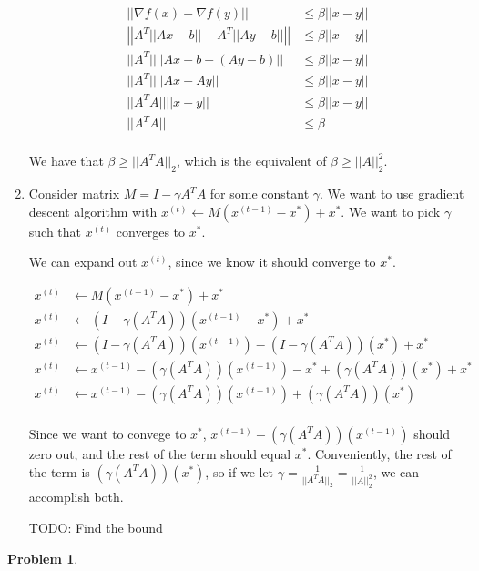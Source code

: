 \documentclass[11pt]{article}
\theoremstyle{definition}
\theoremstyle{case}
\theoremstyle{theorem}
\newtheorem{prob}{Problem}
\begin{document}
\begin{enumerate}[label=(\alph*)]
\begin{align*}
|| \nabla f(x) - \nabla f(y) || &\leq \beta ||x - y|| \\
\left|\left| A^T || Ax - b ||  - A^T || Ay - b || \right|\right| &\leq \beta ||x - y|| \\
|| A^T || || Ax -b - (Ay - b) || &\leq \beta ||x - y|| \\
|| A^T || || Ax - Ay || &\leq \beta ||x - y|| \\
|| A^T A || || x - y || &\leq \beta ||x - y|| \\
|| A^T A || &\leq \beta \\
\end{align*}

We have that $\beta \geq ||A^T A||_2$, which is the equivalent of $\beta \geq ||A||_2^2$.

\item Consider matrix $M = I - \gamma A^T A$ for some constant $\gamma$. We want to use gradient descent
algorithm with $x^{(t)} \longleftarrow M(x^{(t-1)} - x^*) + x^*$. We want to pick $\gamma$ such that $x^{(t)}$ 
converges to $x^*$.

We can expand out $x^{(t)}$, since we know it should converge to $x^*$.

\begin{align*}
x^{(t)} &\longleftarrow M(x^{(t-1)} - x^*) + x^* \\
x^{(t)} &\longleftarrow (I - \gamma(A^T A))(x^{(t-1)} - x^*) + x^* \\
x^{(t)} &\longleftarrow (I - \gamma(A^T A))(x^{(t-1)}) - (I - \gamma(A^T A))(x^*) + x^* \\
x^{(t)} &\longleftarrow x^{(t-1)} - (\gamma(A^T A))(x^{(t-1)}) - x^* + (\gamma(A^T A))(x^*) + x^* \\
x^{(t)} &\longleftarrow x^{(t-1)} - (\gamma(A^T A))(x^{(t-1)}) + (\gamma(A^T A))(x^*)\\
\end{align*}

Since we want to convege to $x^*$, $x^{(t-1)} - (\gamma(A^T A))(x^{(t-1)})$ should zero out, and
the rest of the term should equal $x^*$. Conveniently, the rest of the term is $(\gamma(A^T A))(x^*)$, so
if we let $\gamma = \frac{1}{||A^T A||_2} = \frac{1}{||A||_2^2}$, we can accomplish both.

TODO: Find the bound

\end{enumerate}

\newpage

\begin{prob}
\end{prob}
\end{document}
